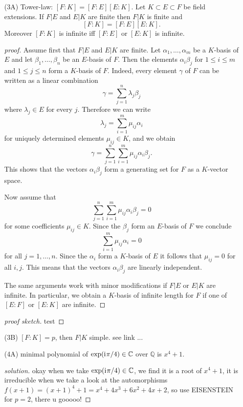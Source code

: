 \documentclass[]{scrartcl}
\newcommand{\Q}{\mathbb{Q}}
\newcommand{\C}{\mathbb{C}}
\newcommand{\<}{\trianglelefteq}
\newcommand{\ii}{\mathrm{i}\mkern1mu}    					%
\begin{document}
\begin{itemize}
	\begin{proof}[proof sketch]
	\end{proof}
	\item[(3A)] Tower-law: $[F \colon K] = [F\colon E][E\colon K]$. Let $ K \subset E \subset F $ be field extensions. If $ F|E $ and $ E|K $ are finite then $ F|K $ is finite and 
	$$
	[F:K] = [F:E][E:K]. 
	$$
	Moreover $ [F:K] $ is infinite iff $ [F:E] $ or $ [E:K] $ is infinite.  
\begin{proof}[proof]
	Assume first that $ F|E $ and $ E|K $ are finite. Let $ \alpha_1, \dots, \alpha_m $ be a $ K $-basis of $ E $ 
	and let $ \beta_1, \dots, \beta_n $ be an $ E $-basis of $ F $. Then the elements $ \alpha_i \beta_j $ for $ 1 \leq i \leq m $ 
	and $ 1 \leq j \leq n $ form a $ K $-basis of $ F $. Indeed, every element $ \gamma $ of $ F $ can be written as a linear combination 
	$$
	\gamma = \sum_{j = 1}^n \lambda_j \beta_j
	$$
	where $ \lambda_j \in E $ for every $ j $. Therefore we can write 
	$$
	\lambda_j = \sum_{i = 1}^m \mu_{ij} \alpha_i
	$$
	for uniquely determined elements $ \mu_{ij} \in K $, and we obtain 
	$$
	\gamma = \sum_{j = 1}^n \sum_{i = 1}^m \mu_{ij} \alpha_i \beta_j. 
	$$
	This shows that the vectors $ \alpha_i \beta_j $ form a generating set for $ F $ as a $ K $-vector space. 
	
	Now assume that 
	$$
	\sum_{j = 1}^n \sum_{i = 1}^m \mu_{ij} \alpha_i \beta_j = 0 
	$$
	for some coefficients $ \mu_{ij} \in K $. Since the $ \beta_j $ form an $ E $-basis of $ F $ we conclude 
	$$
	\sum_{i = 1}^m \mu_{ij} \alpha_i = 0 
	$$
	for all $ j = 1, \dots, n $. Since the $ \alpha_i $ form a $ K $-basis of $ E $ it follows that $ \mu_{ij} = 0 $ 
	for all $ i, j $. This means that the vectors $ \alpha_i \beta_j $ are linearly independent.
	
	The same arguments work with minor modifications if $ F|E $ or $ E|K $ are infinite. In particular, we obtain 
	a $ K $-basis of infinite length for $ F $ if one of $ [E:F] $ or $ [E:K] $ are infinite.
\end{proof}
	\begin{proof}[proof sketch]
		test 
	\end{proof}
	\item[(3B)] $[F\colon K] = p$, then $F|K$ simple.
		see link ...
	\item[(4A)] minimal polynomial of $\exp(\ii \pi/4) \in \C$ over $\Q$ is $x^4+1$.
	\begin{proof}[solution]
		okay when we take $\exp(\ii \pi/4) \in \C$, we find it is a root of $x^4+1$, it is irreducible when we take a look at the automorphisms $f(x+1) = (x+1)^4 + 1 = x^4+4x^3+6x^2+4x +2$, so use EISENSTEIN for $p=2$, there u gooooo!
		

\end{proof}
\end{itemize}
\end{document}
